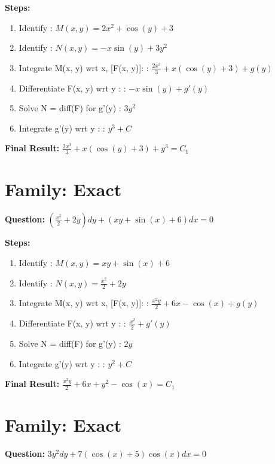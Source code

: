 \documentclass{article}
\begin{document}
\textbf{Steps:}
\begin{enumerate}
\item Identify :  $M(x, y) = 2 x^{2} + \cos{\left(y \right)} + 3$
\item Identify :  $N(x, y) = - x \sin{\left(y \right)} + 3 y^{2}$
\item Integrate M(x, y) wrt x, [F(x, y)]: :  $\frac{2 x^{3}}{3} + x \left(\cos{\left(y \right)} + 3\right) + g(y)$
\item Differentiate F(x, y) wrt y :  :  $- x \sin{\left(y \right)} + g'(y)$
\item Solve N = diff(F) for g'(y) :  $3 y^{2}$
\item Integrate g'(y) wrt y :  :  $y^{3} + C$
\end{enumerate}
\textbf{Final Result:} $\frac{2 x^{3}}{3} + x \left(\cos{\left(y \right)} + 3\right) + y^{3} = C_{1}$

\section*{Family: Exact}
\textbf{Question:} $\left(\frac{x^{2}}{2} + 2 y\right) dy + \left(x y + \sin{\left(x \right)} + 6\right) dx = 0$

\textbf{Steps:}
\begin{enumerate}
\item Identify :  $M(x, y) = x y + \sin{\left(x \right)} + 6$
\item Identify :  $N(x, y) = \frac{x^{2}}{2} + 2 y$
\item Integrate M(x, y) wrt x, [F(x, y)]: :  $\frac{x^{2} y}{2} + 6 x - \cos{\left(x \right)} + g(y)$
\item Differentiate F(x, y) wrt y :  :  $\frac{x^{2}}{2} + g'(y)$
\item Solve N = diff(F) for g'(y) :  $2 y$
\item Integrate g'(y) wrt y :  :  $y^{2} + C$
\end{enumerate}
\textbf{Final Result:} $\frac{x^{2} y}{2} + 6 x + y^{2} - \cos{\left(x \right)} = C_{1}$

\section*{Family: Exact}
\textbf{Question:} $3 y^{2} dy + 7 \left(\cos{\left(x \right)} + 5\right) \cos{\left(x \right)} dx = 0$
\end{document}
